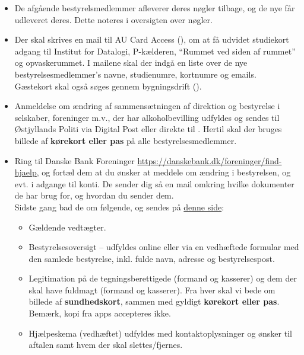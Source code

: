 \begin{itemize}
    \item De afgående bestyrelsmedlemmer afleverer deres nøgler tilbage, og de nye får
    udleveret deres. Dette noteres i oversigten over nøgler.
    \item Der skal skrives en mail til AU Card Access (), om
    at få udvidet studiekort adgang til Institut for Datalogi, P-kælderen, ``Rummet ved 
    siden af rummet'' og opvaskerummet.
    I mailene skal der indgå en liste over de nye bestyrelsesmedlemmer's
    navne, studienumre, kortnumre og emails.\\
    Gæstekort skal også søges gennem bygningsdrift ().
    \item Anmeldelse om ændring af sammensætningen af direktion og bestyrelse i selskaber, foreninger m.v., 
    der har alkoholbevilling udfyldes og sendes til Østjyllands Politi via
    Digital Post eller direkte til .
    Hertil skal der bruges billede af \textbf{kørekort eller pas} på alle bestyrelsesmedlemmer.
    \item Ring til Danske Bank Foreninger \url{https://danskebank.dk/foreninger/find-hjaelp}, 
    og fortæl dem at du ønsker at meddele om ændring i bestyrelsen, og evt. i adgange til konti.
    De sender dig så en mail omkring hvilke dokumenter de har brug for, og hvordan du sender dem.\\
    Sidste gang bad de om følgende, og sendes på \href{https://danskebank.dk/foreninger/send---hent-dokumenter}{denne side}:
    \begin{itemize}
        \item Gældende vedtægter.
        \item Bestyrelsesoversigt – udfyldes online eller via en vedhæftede formular med den samlede bestyrelse, 
        inkl. fulde navn, adresse og bestyrelsespost.
        \item Legitimation på de tegningsberettigede (formand og kasserer) og dem der skal have fuldmagt (formand og kasserer). 
        Fra hver skal vi bede om billede af \textbf{sundhedskort}, sammen med gyldigt \textbf{kørekort eller pas}. 
        Bemærk, kopi fra apps accepteres ikke. 
        \item Hjælpeskema (vedhæftet) udfyldes med kontaktoplysninger og ønsker til aftalen samt hvem der skal slettes/fjernes. 
    \end{itemize}
\end{itemize}


